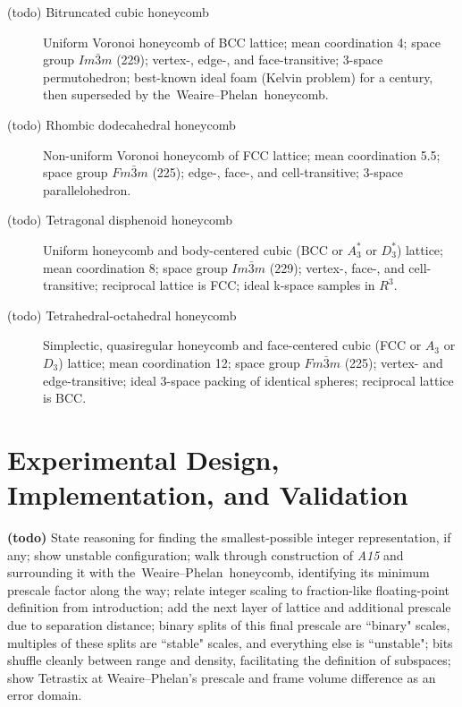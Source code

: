\documentclass[10pt]{article}
\def\AAAB{\textit{A15}}
\def\TS{Tetrastix} \def\TSP{Tetrastix~Prism} \def\TTSp{The~Tetrastix~prism} \def\tTSp{the~Tetrastix~prism}
\def\WP{Weaire--Phelan} \def\WPH{Weaire--Phelan~Honeycomb} \def\TWPh{The~Weaire--Phelan~honeycomb}
\def\tWPh{the~Weaire--Phelan~honeycomb}
\begin{document}
\begin{description}

  \item[(todo) Bitruncated cubic honeycomb] Uniform Voronoi honeycomb of BCC lattice; mean coordination 4; space group
    $Im\bar{3}m$ (229); vertex-, edge-, and face-transitive; 3-space permutohedron; best-known ideal foam (Kelvin problem) for a
    century, then superseded by \tWPh{}.

  \item[(todo) Rhombic dodecahedral honeycomb] Non-uniform Voronoi honeycomb of FCC lattice; mean coordination 5.5; space group
    $Fm\bar{3}m$ (225); edge-, face-, and cell-transitive; 3-space parallelohedron.

  \item[(todo) Tetragonal disphenoid honeycomb] Uniform honeycomb and body-centered cubic (BCC or $A_3^*$ or $D_3^*$) lattice;
    mean coordination 8; space group $Im\bar{3}m$ (229); vertex-, face-, and cell-transitive; reciprocal lattice is FCC; ideal
    k-space samples in $R^3$.

  \item[(todo) Tetrahedral-octahedral honeycomb] Simplectic, quasiregular honeycomb and face-centered cubic (FCC or $A_3$ or
    $D_3$) lattice; mean coordination 12; space group $Fm\bar{3}m$ (225); vertex- and edge-transitive; ideal 3-space packing of
    identical spheres; reciprocal lattice is BCC.

\end{description}


\section{Experimental Design, Implementation, and Validation}\label{experimental-design-implementation-and-validation}

\textbf{(todo)} State reasoning for finding the smallest-possible integer representation, if any; show unstable configuration;
walk through construction of \AAAB{} and surrounding it with \tWPh, identifying its minimum prescale factor along the way; relate
integer scaling to fraction-like floating-point definition from introduction; add the next layer of lattice and additional
prescale due to separation distance; binary splits of this final prescale are ``binary" scales, multiples of these splits are
``stable" scales, and everything else is ``unstable"; bits shuffle cleanly between range and density, facilitating the definition
of subspaces; show \TS{} at \WP's prescale and frame volume difference as an error domain.
\end{document}
